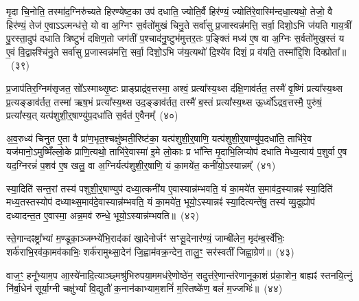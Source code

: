 मृ॒दा चि॒नोति॒ तस्मा॑द॒ग्निरु॑च्यते हिरण्येष्ट॒का उप॑ दधाति॒ ज्योति॒र्वै हिर॑ण्यं॒ ज्योति॑रे॒वास्मि॑न्दधा॒त्यथो॒ तेजो॒ वै हिर॑ण्यं॒ तेज॑ ए॒वा\-ऽऽ\-त्मन्ध॑त्ते॒ यो वा अ॒ग्निꣳ स॒र्वतो॑मुखं चिनु॒ते सर्वा॑सु प्र॒जास्वन्न॑मत्ति॒ सर्वा॒ दिशो॒\-ऽभि ज॑यति गाय॒त्रीं पु॒रस्ता॒दुप॑ दधाति त्रिष्टुभं॑ दक्षिण॒तो जग॑तीं प॒श्चाद॑नु॒ष्टुभ॑मुत्तर॒तः प॒ङ्क्तिं मध्य॑ ए॒ष वा अ॒ग्निः स॒र्वतो॑मुख॒स्तं य ए॒वं वि॒द्वाꣴश्चि॑नु॒ते सर्वा॑सु प्र॒जास्वन्न॑मत्ति॒ सर्वा॒ दिशो॒\-ऽभि ज॑य॒त्यथो॑ दि॒श्ये॑व दिशं॒ प्र व॑यति॒ तस्मा᳚द्दि॒शि दिक्प्रोता᳚॥~(३९)\ip

{\anuvakamend[{अपि॑ सं॒ यौति॑ वैश्वान॒रो यदे॒ष वै पञ्च॑विꣳशतिश्च}]}

प्र॒जा\-प॑तिर॒ग्निम॑सृजत॒ सो᳚\-ऽस्माथ्सृ॒ष्टः प्राङ्प्राद्र॑व॒त्तस्मा॒ अश्वं॒ प्रत्या᳚स्य॒थ्स द॑क्षि॒णाव॑र्तत॒ तस्मै॑ वृ॒ष्णिं प्रत्या᳚स्य॒थ्स प्र॒त्यङ्ङाव॑र्तत॒ तस्मा॑ ऋष॒भं प्रत्या᳚स्य॒थ्स उद॒ङ्ङाव॑र्तत॒ तस्मै॑ ब॒स्तं प्रत्या᳚स्य॒थ्स ऊ॒र्ध्वो᳚\-ऽद्रव॒त्तस्मै॒ पुरु॑षं॒ प्रत्या᳚स्य॒त् यत्प॑शुशी॒र्॒\mbox{}षाण्यु॑प॒दधा॑ति स॒र्वत॑ ए॒वैनम्᳚~(४०)\ip

अ॒व॒रुध्य॑ चिनुत ए॒ता वै प्रा॑ण॒भृत॒श्चक्षु॑ष्मती॒रिष्ट॑का॒ यत्प॑शुशी॒र्॒\mbox{}षाणि॒ यत्प॑शुशी॒र्॒\mbox{}षाण्यु॑प॒दधा॑ति॒ ताभि॑रे॒व यज॑मानो॒\-ऽमुष्मिँ॑ल्लो॒के प्राणि॒त्यथो॒ ताभि॑रे॒वास्मा॑ इ॒मे लो॒काः प्र भा᳚न्ति मृ॒दाभि॒लिप्योप॑ दधाति मेध्य॒त्वाय॑ प॒शुर्वा ए॒ष यद॒ग्निरन्नं॑ प॒शव॑ ए॒ष खलु॒ वा अ॒ग्निर्यत्प॑शुशी॒र्॒\mbox{}षाणि॒ यं का॒मये॑त॒ कनी॑यो॒\-ऽस्यान्नम्᳚~(४१)\ip

स्या॒दिति॑ सन्त॒रां तस्य॑ पशुशी॒र्॒\mbox{}षाण्युप॑ दध्या॒त्कनी॑य ए॒वास्यान्न॑म्भवति॒ यं का॒मये॑त स॒माव॑द॒स्यान्नꣴ॑ स्या॒दिति॑ मध्य॒तस्तस्योप॑ दध्याथ्स॒माव॑दे॒वास्यान्न॑म्भवति॒ यं का॒मये॑त॒ भूयो॒\-ऽस्यान्नꣴ॑ स्या॒दित्यन्ते॑षु॒ तस्य॑ व्यु॒दूह्योप॑ दध्यादन्त॒त ए॒वास्मा॒ अन्न॒मव॑ रुन्धे॒ भूयो॒\-ऽस्यान्न॑म्भवति॥~(४२)\ip

{\anuvakamend[{ए॒न॒म॒स्यान्न॒म्भूयो॒स्यान्न॑म्भवति}]}%

स्ते॒गान्दꣴष्ट्रा᳚भ्यां म॒ण्डूका॒ञ्जम्भ्ये॑भि॒राद॑कां खा॒देनोर्जꣳ॑ सꣳसू॒देनार॑ण्यं॒ जाम्बी॑लेन॒ मृद॑म्ब॒र्स्वे॑भिः॒ शर्क॑राभि॒रव॑का॒मव॑काभिः॒ शर्क॑रामुथ्सा॒देन॑ जि॒ह्वाम॑वक्र॒न्देन॒ तालु॒ꣳ॒ सर॑स्वतीं जिह्वा॒ग्रेण॑॥~(४३)\ip

{\anuvakamend[{स्ते॒गान्द्वाविꣳ॑शतिः}]}%

वाज॒ꣳ॒ हनू᳚भ्याम॒प आ॒स्ये॑नादि॒त्याञ्छ्मश्रु॑भिरुपया॒ममध॑रे॒णोष्ठे॑न॒ सदुत्त॑रे॒णान्त॑रेणानूका॒शं प्र॑का॒शेन॒ बाह्यꣴ॑ स्तनयि॒त्नुं नि॑र्बा॒धेन॑ सूर्या॒ग्नी चक्षु॑र्भ्यां वि॒द्युतौ॑ क॒नान॑काभ्याम॒शनिं॑ म॒स्तिष्के॑ण॒ बलं॑ म॒ज्जभिः॑॥~(४४)\ip

